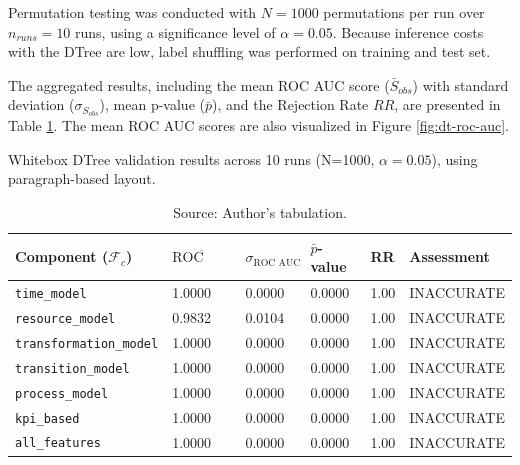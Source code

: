 Permutation testing was conducted with $N = 1000$ permutations per run over $n_{runs}=10$ runs, using a significance level of $\alpha = 0.05$. Because inference costs with the DTree are low, label shuffling was performed on training and test set.

The aggregated results, including the mean ROC AUC score ($\bar{S}_{obs}$) with standard deviation ($\sigma_{S_{obs}}$), mean p-value ($\bar{p}$), and the Rejection Rate $RR$, are presented in Table \ref{tab:results-whitebox}. The mean ROC AUC scores are also visualized in Figure \ref{fig:dt-roc-auc}.

\begin{table}[htbp]
    \centering
    \caption[Whitebox Model Results]{Whitebox DTree validation results across 10 runs (N=1000, $\alpha=0.05$), using paragraph-based layout.}
    \label{tab:results-whitebox}
    \begin{tabular}{l l l l l p{3cm}}
        \toprule
        \textbf{Component ($\mathcal{F}_c$)} & \textbf{$\overline{\text{ROC AUC}}$} & \textbf{$\sigma_{\text{ROC AUC}}$} & \textbf{$\bar{p}$-value} & \textbf{RR} & \textbf{Assessment} \\
        \midrule
        \texttt{time\_model}                 & 1.0000                               & 0.0000                             & 0.0000                   & 1.00        & INACCURATE          \\
        \texttt{resource\_model}             & 0.9832                               & 0.0104                             & 0.0000                   & 1.00        & INACCURATE          \\
        \texttt{transformation\_model}       & 1.0000                               & 0.0000                             & 0.0000                   & 1.00        & INACCURATE          \\
        \texttt{transition\_model}           & 1.0000                               & 0.0000                             & 0.0000                   & 1.00        & INACCURATE          \\
        \texttt{process\_model}              & 1.0000                               & 0.0000                             & 0.0000                   & 1.00        & INACCURATE          \\
        \texttt{kpi\_based}                  & 1.0000                               & 0.0000                             & 0.0000                   & 1.00        & INACCURATE          \\
        \texttt{all\_features}               & 1.0000                               & 0.0000                             & 0.0000                   & 1.00        & INACCURATE          \\
        \bottomrule
    \end{tabular}
    \caption*{Source: Author's tabulation.}
\end{table}


